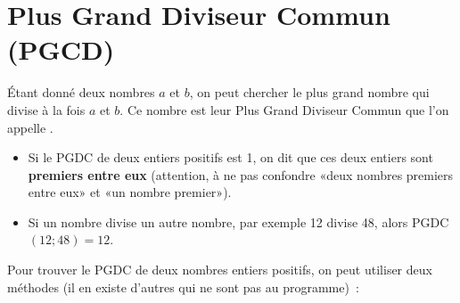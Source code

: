  \newpage
 
 \section{Plus Grand Diviseur Commun (PGCD)}
 
 \begin{definition}
Étant donné deux nombres $a$ et $b$, on peut chercher le plus grand nombre qui divise à la fois $a$ et $b$. Ce nombre est leur Plus Grand Diviseur Commun que l'on appelle .
\begin{itemize}
 \item Si le PGDC de deux entiers positifs est 1, on dit que ces deux entiers sont \textbf{premiers entre eux} (attention, à ne pas confondre «deux nombres premiers entre eux» et «un nombre premier»).
 \item Si un nombre divise un autre nombre, par exemple 12 divise 48, alors PGDC $(12 ; 48) = 12$.
 \end{itemize}
\end{definition}
 
 \vspace{1em}
 
 Pour trouver le PGDC de deux nombres entiers positifs, on peut utiliser deux méthodes (il en existe d'autres qui ne sont pas au programme) : \\[1em]


